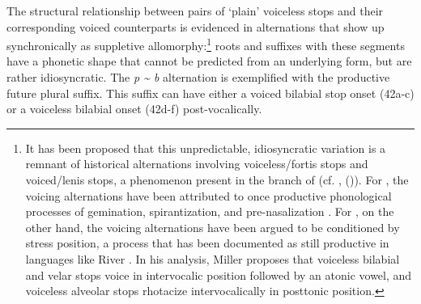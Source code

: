 The structural relationship between pairs of ‘plain’ voiceless stops and their corresponding voiced counterparts is evidenced in alternations that show up synchronically as suppletive allomorphy:\footnote{It has been proposed that this unpredictable, idiosyncratic variation is a remnant of historical alternations involving voiceless/fortis stops and voiced/lenis stops, a phenomenon present in the  branch of  (cf.  \citep{Sapir1931},  (\citealt{zigmond1991kawaiisu})). For , the voicing alternations have been attributed to once productive phonological processes of gemination, spirantization, and pre-nasalization \parencite{sapir1930southern}. For , on the other hand, the voicing alternations have been argued to be conditioned by stress position, a process that has been documented as still productive in languages like River  \citep[][52]{Miller1996}. In his analysis, Miller proposes that voiceless bilabial and velar stops voice in intervocalic position followed by an atonic vowel, and voiceless alveolar stops rhotacize intervocalically in posttonic position.} roots and suffixes with these segments have a phonetic shape that cannot be predicted from an underlying form, but are rather idiosyncratic. The \textit{p {\textasciitilde} b} alternation is exemplified with the productive future plural suffix. This suffix can have either a voiced bilabial stop onset (42a-c) or a voiceless bilabial onset (42d-f) post-vocalically.









